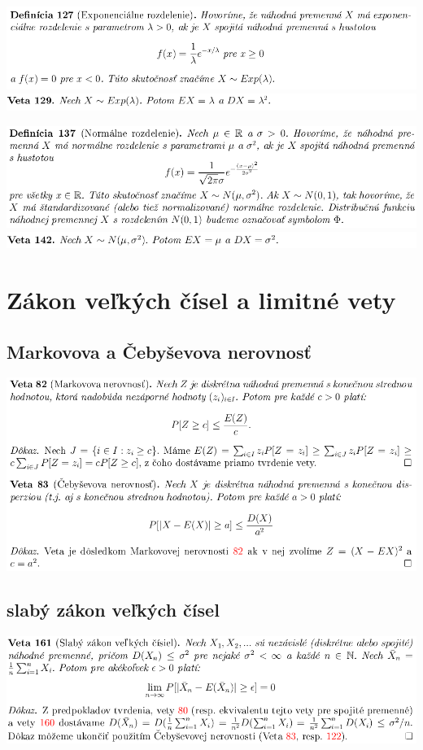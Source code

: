 \includegraphics[width=1\textwidth]{images/exp_rozd}\\
\includegraphics[width=1\textwidth]{images/exp_rozd_II}

\includegraphics[width=1\textwidth]{images/norm_rozd}\\
\includegraphics[width=1\textwidth]{images/norm_rozd_II}\\

\section{Zákon veľkých čísel a limitné vety}

\subsection {Markovova a Čebyševova nerovnosť}
\includegraphics[width=1\textwidth]{images/mark_cebys_ner}\\
\subsection {slabý zákon veľkých čísel}
\includegraphics[width=1\textwidth]{images/slaby_zak_velk_cis}\\
